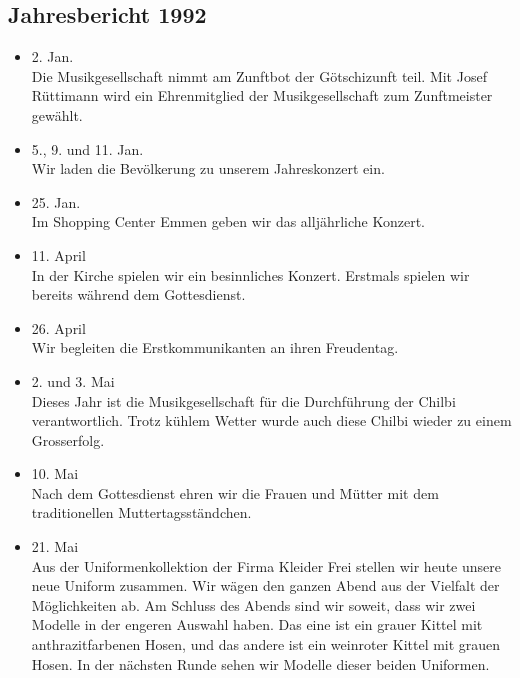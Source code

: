 \subsection{Jahresbericht 1992}

\begin{history}


    \begin{itemize}

        \item[]2. Jan.\\
        Die Musikgesellschaft nimmt am Zunftbot der Götschizunft teil. Mit Josef
        Rüttimann wird ein Ehrenmitglied der Musikgesellschaft zum Zunftmeister
        gewählt.

        \item[]5., 9. und 11. Jan.\\
        Wir laden die Bevölkerung zu unserem Jahreskonzert ein.

        \item[]25. Jan.\\
        Im Shopping Center Emmen geben wir das alljährliche Konzert.

        \item[]11. April\\
        In der Kirche spielen wir ein besinnliches Konzert. Erstmals spielen wir
        bereits während dem Gottesdienst.

        \item[]26. April\\
        Wir begleiten die Erstkommunikanten an ihren Freudentag.

        \item[]2. und 3. Mai\\
        Dieses Jahr ist die Musikgesellschaft für die Durchführung der Chilbi
        verantwortlich. Trotz kühlem Wetter wurde auch diese Chilbi wieder zu
        einem Grosserfolg.

        \item[]10. Mai\\
        Nach dem Gottesdienst ehren wir die Frauen und Mütter mit dem
        traditionellen Muttertagsständchen.

        \item[]21. Mai\\
        Aus der Uniformenkollektion der Firma Kleider Frei stellen wir heute
        unsere neue Uniform zusammen. Wir wägen den ganzen Abend aus der
        Vielfalt der Möglichkeiten ab. Am Schluss des Abends sind wir soweit,
        dass wir zwei Modelle in der engeren Auswahl haben. Das eine ist ein
        grauer Kittel mit anthrazitfarbenen Hosen, und das andere ist ein
        weinroter Kittel mit grauen Hosen. In der nächsten Runde sehen wir
        Modelle dieser beiden Uniformen.


\end{itemize}
\end{history}
